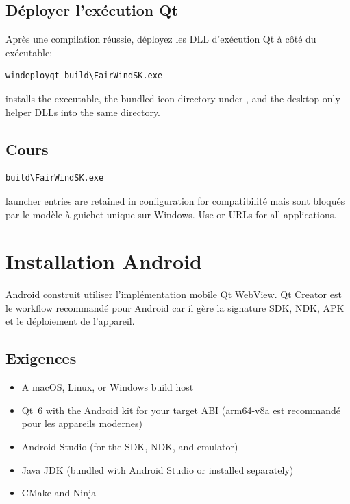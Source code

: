 \subsection{Déployer l'exécution Qt}

Après une compilation réussie, déployez les DLL d'exécution Qt à côté du
exécutable:

\begin{lstlisting}
windeployqt build\FairWindSK.exe
\end{lstlisting}

 installs the executable, the bundled icon
directory under , and the desktop-only
helper DLLs into the same  directory.

\subsection{Cours}

\begin{lstlisting}
build\FairWindSK.exe
\end{lstlisting}

\begin{notebox}
 launcher entries are retained in configuration for
compatibilité mais sont bloqués par le modèle à guichet unique sur Windows.
Use  or  URLs for all applications.
\end{notebox}

\section{Installation Android}
\label{app:android}

Android construit utiliser l'implémentation mobile Qt WebView.
Qt Creator est le workflow recommandé pour Android car il gère
la signature SDK, NDK, APK et le déploiement de l'appareil.

\subsection{Exigences}

\begin{itemize}
  \item A macOS, Linux, or Windows build host
  \item Qt~6 with the Android kit for your target ABI
(arm64-v8a est recommandé pour les appareils modernes)
  \item Android Studio (for the SDK, NDK, and emulator)
  \item Java JDK (bundled with Android Studio or installed separately)
  \item CMake and Ninja
\end{itemize}

